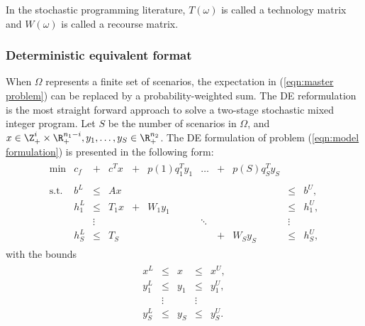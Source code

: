  In the stochastic programming literature, $T(\omega)$ is called a technology matrix and $W(\omega)$ is called a recourse matrix.

\subsubsection{Deterministic equivalent format}
\label{subsubsec: Deterministic equivalent format}

When $\Omega$ represents a finite set of scenarios, the expectation in (\ref{eqn:master problem}) can be replaced by a probability-weighted sum.  The DE reformulation is the most straight forward approach to solve a two-stage stochastic mixed integer program. Let $S$ be the number of scenarios in $\Omega$, and $x \in \Z^{i}_{+} \times \R^{n_1 - i}_{+}, y_1,\ldots ,y_S \in \R^{n_2}_{+}$. The DE formulation of problem (\ref{eqn:model formulation}) is presented in the following form:
\begin{align}
\begin{array}{rllllllllll}
    {\min}      & c_f  &+         & c^T x  & +& p(1) q_1^T y_1       & \ldots & + &p(S) q_S^T y_S & & \\
                    &   &   &     &             &        &  &  &  &  \\
    \text{s.t.} &  b^L &\leq& Ax  &                      &        &                  & &             &\leq  & b^U, \\
                &  h^L_1 &\leq& T_1 x & + &W_1 y_1     &      &     &     & \leq & h^U_1, \\
                &          & \vdots&                 &    &         &       \ddots   &        &              & \vdots &        \\
                &  h^L_S & \leq &T_S  &     &             &        &  +& W_S y_S    &\leq  & h^U_S,
\end{array}
\end{align}
with the bounds
\begin{align}
\begin{array}{lllll}
                 x^L           & \leq   & x    & \leq   & x^U,     \\
                 y^L_1         & \leq   & y_1  & \leq   & y^U_1,   \\
                               & \vdots &      & \vdots &          \\
                 y^L_S         & \leq   & y_S  & \leq   & y^U_S.
\end{array}
\end{align}

